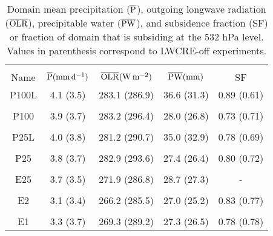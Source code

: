 \documentclass[draft]{agujournal2019}
\begin{document}
\begin{table}
\begin{center}
\caption{Domain mean precipitation ($\overline{\rm{P}}$), outgoing longwave radiation 
($\overline{\rm{OLR}}$), precipitable water ($\overline{\rm{PW}}$), and subsidence fraction (SF)  
or fraction of domain that is subsiding at the 532 hPa level.
Values in parenthesis correspond to LWCRE-off experiments.}
    \begin{tabular}{*{5}{c}}
    \hline
    \hline
    \\
 Name &   $\overline{\rm{P}} (\mathrm{mm \,d^{-1}})$ & $\overline{\rm{OLR}} (\rm{W \, m^{-2}})$ & $\overline{\rm{PW}} (\rm{mm})$ & SF   \\ \hline
  P100L   &  4.1 (3.5)   &  283.1 (286.9)  & 36.6 (31.3)  & 0.89 (0.61)      \\ 
    \\
  P100 &   3.9 (3.7)   &  283.2 (296.4)  & 28.0 (26.8) & 0.73 (0.71)           \\  
    \\
  P25L &   4.0 (3.8)  &  281.2 (290.7)   & 35.0 (32.9) & 0.78 (0.69)          \\  
    \\
  P25  &   3.8 (3.7)    & 282.9 (293.6)   & 27.4 (26.4) & 0.80 (0.72)          \\  
    \\
 E25  & 3.7 (3.5)    &   271.9 (286.8)   & 28.7 (27.3) & -            \\  
    \\
 E2   &  3.1 (3.4)   &  266.2 (285.5)    & 27.0 (25.2) & 0.83 (0.77)           \\ 
    \\
 E1   &  3.3 (3.7)   &  269.3 (289.2)    & 27.3 (26.5) & 0.78 (0.78)         \\  \hline

    \end{tabular}\par
    \label{tab:experimentmeans}
\end{center}
\end{table}


\end{document}
